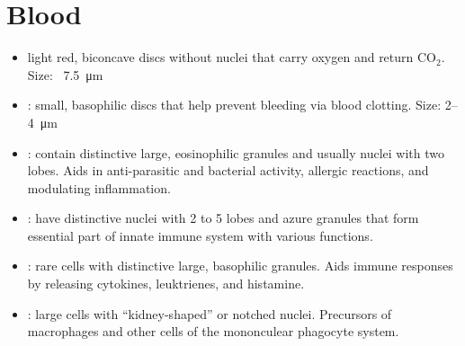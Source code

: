 \newpage
\section{Blood}
\begin{multicols}{2}
\begin{itemize}
  \item {}  light red, biconcave discs without nuclei that carry oxygen and return CO\(_2\).
  Size: \approx~\SI{7.5}{\micro\meter}
  
  \begin{center}
  \end{center}

  \item {}: small, basophilic discs that help prevent bleeding via blood clotting. Size: 2--\SI{4}{\micro\m}
  
  \begin{center}
  \end{center}

  \item {}: contain distinctive large, eosinophilic granules and usually nuclei with two lobes. Aids in anti-parasitic and bacterial activity, allergic reactions, and modulating inflammation.

  \begin{center}
  \end{center}

  \item {}: have distinctive nuclei with 2 to 5 lobes and azure granules that form essential part of innate immune system with various functions.

  \begin{center}
  \end{center}

  \item {}: rare cells with distinctive large, basophilic granules. Aids immune responses by releasing cytokines, leuktrienes, and histamine. 

  \begin{center}
  \end{center}

  \item {}:  large cells with ``kidney-shaped'' or notched nuclei. Precursors of macrophages and other cells of the mononculear phagocyte system.

  \begin{center}
  \end{center}
\end{itemize}
\end{multicols}
